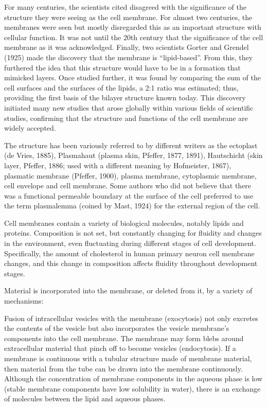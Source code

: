 \documentclass[
]{book}
\begin{document}
For many centuries, the scientists cited disagreed with the significance of the structure they were seeing as the cell membrane. For almost two centuries, the membranes were seen but mostly disregarded this as an important structure with cellular function. It was not until the 20th century that the significance of the cell membrane as it was acknowledged. Finally, two scientists Gorter and Grendel (1925) made the discovery that the membrane is ``lipid-based''. From this, they furthered the idea that this structure would have to be in a formation that mimicked layers. Once studied further, it was found by comparing the sum of the cell surfaces and the surfaces of the lipids, a 2:1 ratio was estimated; thus, providing the first basis of the bilayer structure known today. This discovery initiated many new studies that arose globally within various fields of scientific studies, confirming that the structure and functions of the cell membrane are widely accepted.

The structure has been variously referred to by different writers as the ectoplast (de Vries, 1885), Plasmahaut (plasma skin, Pfeffer, 1877, 1891), Hautschicht (skin layer, Pfeffer, 1886; used with a different meaning by Hofmeister, 1867), plasmatic membrane (Pfeffer, 1900), plasma membrane, cytoplasmic membrane, cell envelope and cell membrane. Some authors who did not believe that there was a functional permeable boundary at the surface of the cell preferred to use the term plasmalemma (coined by Mast, 1924) for the external region of the cell.

Cell membranes contain a variety of biological molecules, notably lipids and proteins. Composition is not set, but constantly changing for fluidity and changes in the environment, even fluctuating during different stages of cell development. Specifically, the amount of cholesterol in human primary neuron cell membrane changes, and this change in composition affects fluidity throughout development stages.

Material is incorporated into the membrane, or deleted from it, by a variety of mechanisms:

Fusion of intracellular vesicles with the membrane (exocytosis) not only excretes the contents of the vesicle but also incorporates the vesicle membrane's components into the cell membrane. The membrane may form blebs around extracellular material that pinch off to become vesicles (endocytosis).
If a membrane is continuous with a tubular structure made of membrane material, then material from the tube can be drawn into the membrane continuously.
Although the concentration of membrane components in the aqueous phase is low (stable membrane components have low solubility in water), there is an exchange of molecules between the lipid and aqueous phases.
\end{document}
